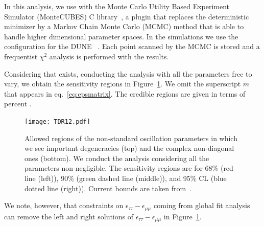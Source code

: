 In this analysis, we use  with the Monte Carlo Utility Based Experiment Simulator (MonteCUBES) C library~\cite{Blennow:2009pk}, a plugin that replaces the deterministic   minimizer by a Markov Chain Monte Carlo (MCMC) method that is able to handle higher dimensional parameter spaces. In the simulations we use the configuration for the DUNE ~\cite{Alion:2016uaj}. Each point scanned by the MCMC is stored and a frequentist $\chi^2$ analysis is performed with the results.

Considering that   exists, conducting the analysis with all the   parameters free to vary, we obtain the sensitivity regions in Figure~\ref{fig:nsi}. We omit the superscript $m$ that appears in eq.~\ref{eq:epsmatrix}. 
The credible regions are given in terms of percent .
\begin{figure}[!htb]
	\centering
    \texttt{[image: TDR12.pdf]}
%    
   \caption[NSI parameters. Allowed regions.]{\label{fig:nsi}Allowed regions of the non-standard oscillation parameters in which we see important degeneracies (top) and the complex non-diagonal ones (bottom). We conduct the analysis considering all the   parameters non-negligible. The sensitivity regions are for 68\% (red line (left)), 90\% (green dashed line (middle)), and 95\% CL (blue dotted line (right)). Current bounds are taken from~\cite{Gonzalez-Garcia:2013usa}.}
\end{figure}
We note, however, that constraints on $\epsilon_{\tau\tau}-\epsilon_{\mu\mu}$ coming from global fit analysis~\cite{Gonzalez-Garcia:2013usa,Miranda:2015dra,Farzan:2017xzy,Esteban:2018ppq} can remove the left and right solutions of $\epsilon_{\tau\tau}-\epsilon_{\mu\mu}$ in Figure~\ref{fig:nsi}.

